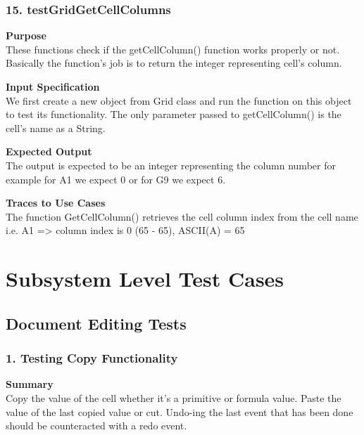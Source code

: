 \documentclass[12pt]{article}
\begin{document}
\subsubsection{15. testGridGetCellColumns} \label{tc:1}

\noindent
{\bf Purpose}\\
These functions check if the getCellColumn() function works properly or not. Basically the function’s job is to return the integer representing cell’s column.

\noindent
{\bf Input Specification}\\
We first create a new object from Grid class and run the function on this object to test its functionality. The only parameter passed to getCellColumn() is the cell’s name as a String.

\noindent
{\bf Expected Output}\\
The output is expected to be an integer representing the column number for example for A1 we expect 0 or for G9 we expect 6.

\noindent
{\bf Traces to Use Cases}\\
The function GetCellColumn() retrieves the cell column index from the cell name i.e. A1 => column index is 0 (65 - 65), ASCII(A) = 65

\section{Subsystem Level Test Cases}
\subsection{Document Editing Tests}

\subsubsection{1. Testing Copy Functionality}

\noindent
{\bf Summary}\\
Copy the value of the cell whether it's a primitive or formula value. Paste the value of the last copied value or cut. Undo-ing the last event that has been done should be counteracted with a redo event.
\end{document}
